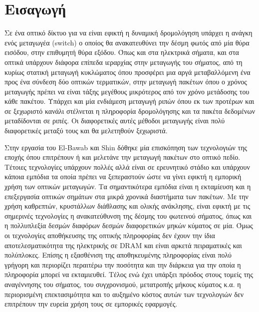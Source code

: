 ﻿\section{Εισαγωγή}

Σε ένα οπτικό δίκτυο για να είναι εφικτή η δυναμική δρομολόγηση
υπάρχει η ανάγκη ενός μεταγωγέα (switch) ο οποίος θα ανακατευθύνει την
δέσμη φωτός από μία θύρα εισόδου, στην επιθυμητή θύρα εξόδου. Όπως και
στα ηλεκτρικά σήματα, και στα οπτικά υπάρχουν διάφορα επίπεδα
ιεραρχίας στην μεταγωγής του σήματος, από τη κυρίως στατική μεταγωγή
κυκλώματος όπου προσφέρει μια αργά μεταβαλλόμενη ένα προς ένα σύνδεση
δύο οπτικών τερματικών, στην μεταγωγή πακέτων όπου ο χρόνος μεταγωγής
πρέπει να είναι τάξης μεγέθους μικρότερος από τον χρόνο μετάδοσης του
κάθε πακέτου. Υπάρχει και μία ενδιάμεση μεταγωγή ριπών όπου εκ των
προτέρων και σε ξεχωριστό κανάλι στέλνεται η πληροφορία δρομολόγησης
και τα πακέτα δεδομένων μεταδίδονται σε ριπές. Οι διαφορετικές αυτές
μέθοδοι μεταγωγής είναι πολύ διαφορετικές μεταξύ τους και θα
μελετηθούν ξεχωριστά.


Στην εργασία του El-Bawab και Shin \cite{1031830} δόθηκε μία
επισκόπηση των τεχνολογιών της εποχής όπου επιτρέπουν ή και μελετάνε
την μεταγωγή πακέτων στο οπτικό πεδίο. Τέτοιες τεχνολογίες υπάρχουν
πολλές αλλά είναι σε ερευνητικό στάδιο και υπάρχουν κάποια εμπόδια τα
οποία πρέπει να ξεπεραστούν ώστε να γίνει εφικτή η εμπορική χρήση των
οπτικών μεταγωγών. Τα σημαντικότερα εμπόδια είναι η εκταμίευση και η
επεξεργασία οπτικών σημάτων στα μικρά χρονικά διαστήματα των
πακέτων. Με την χρήση καθρεπτών, κρυστάλλων διάθλασης και ολικής
ανάκλησης, είναι εφικτή με τις σημερινές τεχνολογίες η ανακατεύθυνση
της δέσμης του φωτεινού σήματος, όπως και η πολλυπλεξία δεσμών
διαφόρων δεσμών διαφορετικών μηκών κύματος σε μία. Όμως οι τεχνολογίες
αποθήκευσης της οπτικής πληροφορίας δεν έχουν την ίδια
αποτελεσματικότητα της ηλεκτρικής σε DRAM και είναι αρκετά
πειραματικές και πολύπλοκες. Επίσης η εξασθένιση της αποθηκευμένης
πληροφορίας είναι πολύ γρήγορη και περιορίζει περαιτέρω την ποσότητα
και την διάρκεια για την οποία η πληροφορία μπορεί να
εκταμιευθεί. Τέλος ενώ έχει υπάρξει πρόοδος στους τομείς της
αναγέννησης του σήματος, του συγχρονισμού, μετατροπής μήκους κύματος
κ.α. η περιορισμένη επεκτασιμότητα και το αυξημένο κόστος αυτών των
τεχνολογιών δεν επιτρέπουν την ευρεία χρήση τους σε εμπορικές
εφαρμογές.




